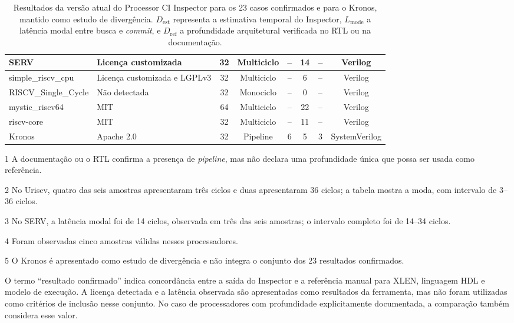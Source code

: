 \begin{table}[t]
\begin{threeparttable}
{\begin{tabular}{|l|l|c|c|c|c|c|c|}
  \hline
  SERV & Licença customizada & 32 & Multiciclo & -- & 14\tnote{3} & -- & Verilog \\
  \hline
  simple\_riscv\_cpu & Licença customizada e LGPLv3 & 32 & Multiciclo & -- & 6 & -- & Verilog \\
  \hline
  RISCV\_Single\_Cycle & Não detectada & 32 & Monociclo & -- & 0 & -- & Verilog \\
  \hline
  mystic\_riscv64 & MIT & 64 & Multiciclo & -- & 22\tnote{4} & -- & Verilog \\
  \hline
  riscv-core & MIT & 32 & Multiciclo & -- & 11\tnote{4} & -- & Verilog \\
  \hline
  Kronos\tnote{5} & Apache 2.0 & 32 & Pipeline & 6 & 5 & 3 & SystemVerilog \\
  \hline
\end{tabular}%
}

\begin{tablenotes}
\footnotesize
\item[1] A documentação ou o RTL confirma a presença de \textit{pipeline}, mas
não declara uma profundidade única que possa ser usada como referência.
\item[2] No Uriscv, quatro das seis amostras apresentaram três ciclos e duas
apresentaram 36 ciclos; a tabela mostra a moda, com intervalo de 3--36 ciclos.
\item[3] No SERV, a latência modal foi de 14 ciclos, observada em três das seis
amostras; o intervalo completo foi de 14--34 ciclos.
\item[4] Foram observadas cinco amostras válidas nesses processadores.
\item[5] O Kronos é apresentado como estudo de divergência e não integra o
conjunto dos 23 resultados confirmados.
\end{tablenotes}

\caption{Resultados da versão atual do Processor CI Inspector para os 23 casos
confirmados e para o Kronos, mantido como estudo de divergência.
$D_{\mathrm{est}}$ representa a estimativa temporal do Inspector,
$L_{\mathrm{mode}}$ a latência modal entre busca e \textit{commit}, e
$D_{\mathrm{ref}}$ a profundidade arquitetural verificada no RTL ou na
documentação.}
\label{tab:resultados}
\end{threeparttable}
\end{table}

O termo ``resultado confirmado'' indica concordância entre a saída do
Inspector e a referência manual para XLEN, linguagem HDL e modelo de execução.
A licença detectada e a latência observada são apresentadas como resultados da
ferramenta, mas não foram utilizadas como critérios de inclusão nesse conjunto.
No caso de processadores com profundidade explicitamente documentada, a
comparação também considera esse valor.

